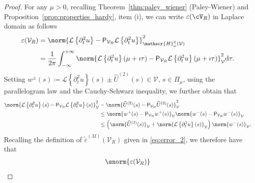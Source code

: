 \begin{proof}
For any $\mu >0$, recalling Theorem~\ref{thm:paley_wiener} (Paley-Wiener)
and Proposition~\ref{prop:properties_hardy}, item (i),
we can write $\varepsilon(\cV_R)$ in Laplace domain as follows
\begin{equation}
\begin{aligned}
	\varepsilon(\mathcal{V}_R)
	&
	=
	\norm{
		\mathcal{L}\left\{\partial^2_t u\right\}
		-
		\mathsf{P}_{\mathcal{V}_R}
		\mathcal{L}\left\{\partial^2_t u\right\}
	}^2_{\mathscr{H}^2_\mu(\mathcal{V})}
	\\
	&
	=
	\frac{1}{2\pi }
		\int_{-\infty}^{+\infty}
		\norm{
    		\mathcal{L}\left\{\partial^2_t u \right\} (\mu+\imath \tau)
    		-
    		\mathsf{P}_{\mathcal{V}_R}
    		\mathcal{L} \left\{\partial^2_t u \right\}(\mu+\imath \tau)
		}^2_\mathcal{V}
		\normalfont\text{d} \tau.
\end{aligned}
\end{equation}
Setting
	$w^\pm(s)
	\coloneqq
	\mathcal{L}\left\{\partial^2_t u \right\}(s) \pm \widehat{U}^{(2)}(s)
	\in \mathcal{V}$,
	$s \in \Pi_\mu$,
using the parallelogram law and the Cauchy-Schwarz inequality,
we further obtain that 
\begin{equation}
\begin{aligned}
		\norm{
    		\mathcal{L}\left\{\partial^2_t u \right\}(s)
    		-
    		\mathsf{P}_{\mathcal{V}_R}
    		\mathcal{L} \left\{\partial^2_t u \right\}(s)
		}^2_\mathcal{V}
		&
		-
		\norm{
    			\widehat{U}^{(2)}(s)
    			-
    			\mathsf{P}_{\mathcal{V}_R}
    			\widehat{U}^{(2)}(s)
		}^2_\mathcal{V}
	\\
	&
	\leq
	\norm{
    	w^+(s)
    	-
    	\mathsf{P}_{\mathcal{V}_R}
    	w^+(s)
	}_\mathcal{V}
	\norm{
    	w^-(s)
    	-
    	\mathsf{P}_{\mathcal{V}_R}
    	w^-(s)
	}_\mathcal{V}
	\\
	&
	\leq
	\left(
	\norm{
    	\widehat{U}^{(2)}(s)
	}_\mathcal{V}
	+
	\norm{
    	\mathcal{L}\left\{\partial^2_t u \right\}(s)
	}_\mathcal{V}
	\right)
	\norm{
    	w^-(s)
	}_\mathcal{V}.
\end{aligned}
\end{equation}
Recalling the definition of $\widetilde{\varepsilon}^{(M)}(\mathcal{V}_R)$ given in \eqref{eq:error_2}, we therefore have that
\begin{equation}
\begin{aligned}
	\snorm{
		\varepsilon(\mathcal{V}_R )
}
\end{aligned}
\end{equation}
\end{proof}
